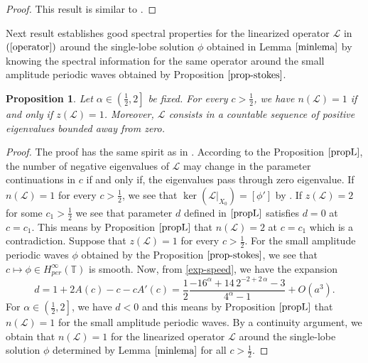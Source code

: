 \documentclass[12pt,reqno]{amsart}
\newcommand{\2}{L^2_{per}(0, T)}
\newtheorem{prop}{Proposition}[section]
\numberwithin{equation}{section}
\numberwithin{figure}{section}
\newtheorem{corollary}[theorem]{Corollary}
\begin{document}
\begin{proof}
	This result is similar to \cite[Lemma 2.3]{NPL}.
\end{proof}

\indent Next result establishes good spectral properties for the linearized operator $\mathcal{L}$ in $(\ref{operator})$ around the single-lobe solution $\phi$ obtained in Lemma $\ref{minlema}$ by knowing the spectral information for the same operator around the small amplitude periodic waves obtained by Proposition $\ref{prop-stokes}$.
\begin{prop}\label{propspec}
	Let $\alpha\in\left(\frac{1}{2},2\right]$ be fixed. For every $c >\frac{1}{2}$, we have $n(\mathcal{L})=1$ if and only if $z(\mathcal{L})=1$. Moreover, $\mathcal{L}$ consists in a countable sequence of positive eigenvalues bounded away from zero.
	\end{prop}
\begin{proof}
	
	The proof has the same spirit as in \cite[Lemma 2.3]{LP}. According to the Proposition $\ref{propL}$, the number of negative eigenvalues
	of $\mathcal{L}$ may change in the parameter continuations in $c$ if and only if, the eigenvalues pass through zero eigenvalue. If $n(\mathcal{L})=1$ for every $c >\frac{1}{2}$, we see that $\ker(\mathcal{L}|_{X_0})=[\phi']$ by \cite[Corollary 4.5]{NPL}. If $z(\mathcal{L})=2$ for some $c_1>\frac{1}{2}$ we see that parameter $d$ defined in $\ref{propL}$ satisfies $d=0$ at $c=c_1$. This means  by Proposition $\ref{propL}$ that $n(\mathcal{L})=2$ at $c=c_1$ which is a contradiction. Suppose that $z(\mathcal{L})=1$ for every $c>\frac{1}{2}$. For the small amplitude periodic waves $\phi$ obtained by the Proposition $\ref{prop-stokes}$, we see that $c\mapsto\phi
	\in H_{per}^{\infty}(\mathbb{T})$ is smooth. Now, from \eqref{exp-speed}, we have the expansion
	\begin{equation}\label{relAder}
	d=1 +2A(c) -c -cA'(c)= \frac{1}{2}\frac {-{16}^{\alpha}+14\,{2}^{-2+2\,\alpha}-3}{{4}^{\alpha}-1}+O(a^3).
	\end{equation}
	For $\alpha\in\left(\frac{1}{2},2\right]$, we have $d<0$ and this means by Proposition $\ref{propL}$ that $n(\mathcal{L})=1$ for the small amplitude periodic waves.  By a continuity argument, we obtain that $n(\mathcal{L})=1$ for the linearized operator $\mathcal{L}$ around the single-lobe solution $\phi$ determined by Lemma $\ref{minlema}$ for all $c > \frac{1}{2}$.
\end{proof}
\end{document}
